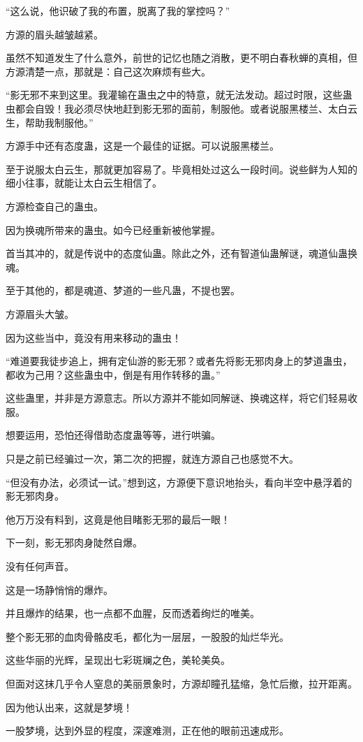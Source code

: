 \begin{this_body}
“这么说，他识破了我的布置，脱离了我的掌控吗？”

方源的眉头越皱越紧。

虽然不知道发生了什么意外，前世的记忆也随之消散，更不明白春秋蝉的真相，但方源清楚一点，那就是：自己这次麻烦有些大。

“影无邪不来到这里。我灌输在蛊虫之中的特意，就无法发动。超过时限，这些蛊虫都会自毁！我必须尽快地赶到影无邪的面前，制服他。或者说服黑楼兰、太白云生，帮助我制服他。”

方源手中还有态度蛊，这是一个最佳的证据。可以说服黑楼兰。

至于说服太白云生，那就更加容易了。毕竟相处过这么一段时间。说些鲜为人知的细小往事，就能让太白云生相信了。

方源检查自己的蛊虫。

因为换魂所带来的蛊虫。如今已经重新被他掌握。

首当其冲的，就是传说中的态度仙蛊。除此之外，还有智道仙蛊解谜，魂道仙蛊换魂。

至于其他的，都是魂道、梦道的一些凡蛊，不提也罢。

方源眉头大皱。

因为这些当中，竟没有用来移动的蛊虫！

“难道要我徒步追上，拥有定仙游的影无邪？或者先将影无邪肉身上的梦道蛊虫，都收为己用？这些蛊虫中，倒是有用作转移的蛊。”

这些蛊里，并非是方源意志。所以方源并不能如同解谜、换魂这样，将它们轻易收服。

想要运用，恐怕还得借助态度蛊等等，进行哄骗。

只是之前已经骗过一次，第二次的把握，就连方源自己也感觉不大。

“但没有办法，必须试一试。”想到这，方源便下意识地抬头，看向半空中悬浮着的影无邪肉身。

他万万没有料到，这竟是他目睹影无邪的最后一眼！

下一刻，影无邪肉身陡然自爆。

没有任何声音。

这是一场静悄悄的爆炸。

并且爆炸的结果，也一点都不血腥，反而透着绚烂的唯美。

整个影无邪的血肉骨骼皮毛，都化为一层层，一股股的灿烂华光。

这些华丽的光辉，呈现出七彩斑斓之色，美轮美奂。

但面对这抹几乎令人窒息的美丽景象时，方源却瞳孔猛缩，急忙后撤，拉开距离。

因为他认出来，这就是梦境！

一股梦境，达到外显的程度，深邃难测，正在他的眼前迅速成形。


\end{this_body}
